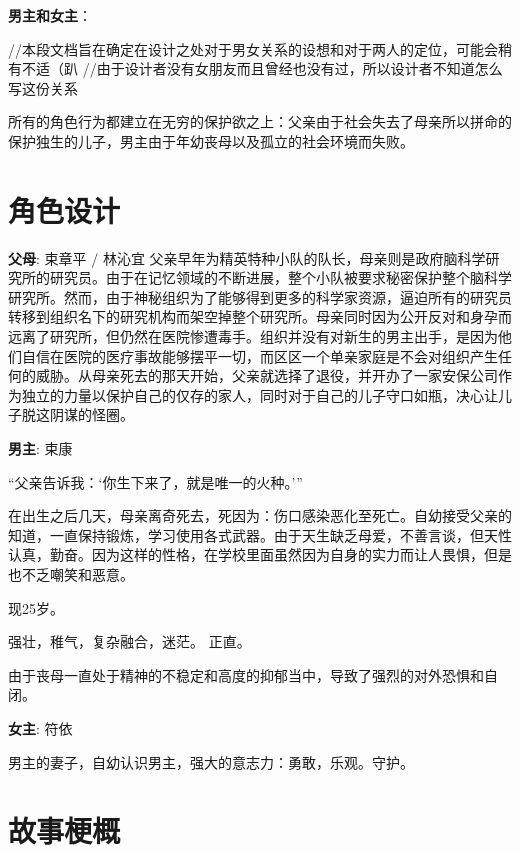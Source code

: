 \documentclass[12pt, a4paper]{article}
\begin{document}
        \textbf{男主和女主}：

        //本段文档旨在确定在设计之处对于男女关系的设想和对于两人的定位，可能会稍有不适（趴
        //由于设计者没有女朋友而且曾经也没有过，所以设计者不知道怎么写这份关系

        所有的角色行为都建立在无穷的保护欲之上：父亲由于社会失去了母亲所以拼命的保护独生的儿子，男主由于年幼丧母以及孤立的社会环境而失败。

    \newpage        
    \section*{角色设计}

        \textbf{父母}: 束章平 / 林沁宜
            父亲早年为精英特种小队的队长，母亲则是政府脑科学研究所的研究员。由于在记忆领域的不断进展，整个小队被要求秘密保护整个脑科学研究所。然而，由于神秘组织为了能够得到更多的科学家资源，逼迫所有的研究员转移到组织名下的研究机构而架空掉整个研究所。母亲同时因为公开反对和身孕而远离了研究所，但仍然在医院惨遭毒手。组织并没有对新生的男主出手，是因为他们自信在医院的医疗事故能够摆平一切，而区区一个单亲家庭是不会对组织产生任何的威胁。从母亲死去的那天开始，父亲就选择了退役，并开办了一家安保公司作为独立的力量以保护自己的仅存的家人，同时对于自己的儿子守口如瓶，决心让儿子脱这阴谋的怪圈。

        \textbf{男主}: 束康

            “父亲告诉我：‘你生下来了，就是唯一的火种。’” 
            
            在出生之后几天，母亲离奇死去，死因为：伤口感染恶化至死亡。自幼接受父亲的知道，一直保持锻炼，学习使用各式武器。由于天生缺乏母爱，不善言谈，但天性认真，勤奋。因为这样的性格，在学校里面虽然因为自身的实力而让人畏惧，但是也不乏嘲笑和恶意。
            


            现25岁。

            强壮，稚气，复杂融合，迷茫。 正直。

            由于丧母一直处于精神的不稳定和高度的抑郁当中，导致了强烈的对外恐惧和自闭。

        \medskip
        \textbf{女主}: 符依


            男主的妻子，自幼认识男主，强大的意志力：勇敢，乐观。守护。 
            
    \newpage 

    \section*{故事梗概}
\end{document}
